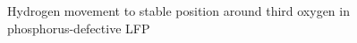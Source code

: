 \documentclass[11pt]{article}
\begin{document}
\begin{figure}[H]
\begin{minipage}[h]{0.5\linewidth}
\end{minipage}
\hfill
\begin{minipage}[h]{0.5\linewidth}
\end{minipage}
\caption{Hydrogen movement to stable position around third oxygen in phosphorus-defective LFP}
\label{O3Finitialfinal}
\end{figure}
\end{document}
